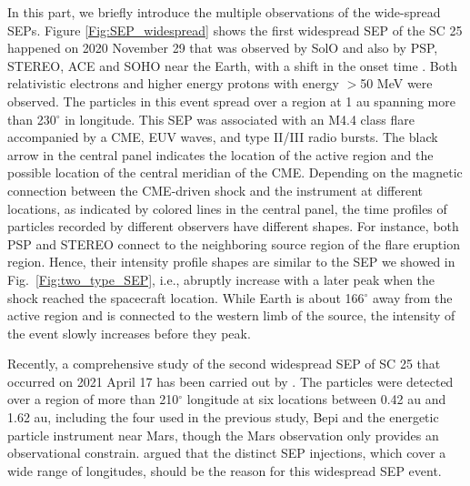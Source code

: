 In this part, we briefly introduce the multiple observations of the wide-spread \acp{SEP}. Figure \ref{Fig:SEP_widespread} shows the first widespread \ac{SEP} of the \ac{SC} 25 happened on 2020 November 29 that was observed by \ac{SolO} and also by \ac{PSP}, \ac{STEREO}, \ac{ACE} and \ac{SOHO} near the Earth, with a shift in the onset time \citep{Kolhoff2021AA, Kouloumvakos2022AA, Palmerio2022SpWea}. Both relativistic electrons and higher energy protons with energy $>$50 MeV were observed. The particles in this event spread over a region at 1 au spanning more than 230$^\circ$ in longitude. This SEP was associated with an M4.4 class flare accompanied by a \ac{CME}, \ac{EUV} waves, and type II/III radio bursts. The black arrow in the central panel indicates the location of the active region and the possible location of the central meridian of the \ac{CME}.  Depending on the magnetic connection between the \ac{CME}-driven shock and the instrument at different locations, as indicated by colored lines in the central panel, the time profiles of particles recorded by different observers have different shapes. For instance, both \ac{PSP} and \ac{STEREO} connect to the neighboring source region of the flare eruption region. Hence, their intensity profile shapes are similar to the \ac{SEP} we showed in Fig.~\ref{Fig:two_type_SEP}, i.e., abruptly increase with a later peak when the shock reached the spacecraft location. While Earth is about 166$^\circ$ away from the active region and is connected to the western limb of the source, the intensity of the event slowly increases before they peak.

Recently, a comprehensive study of the second widespread \ac{SEP} of \ac{SC} 25 that occurred on 2021 April 17 has been carried out by \citet{Dresing2023The17}. The particles were detected over a region of more than 210$^\circ$ longitude at six locations between 0.42 au and 1.62 au, including the four used in the previous study, \ac{Bepi} and the energetic particle instrument near Mars, though the Mars observation only provides an observational constrain. \citet{Dresing2023The17} argued that the distinct \ac{SEP} injections, which cover a wide range of longitudes, should be the reason for this widespread SEP event.

